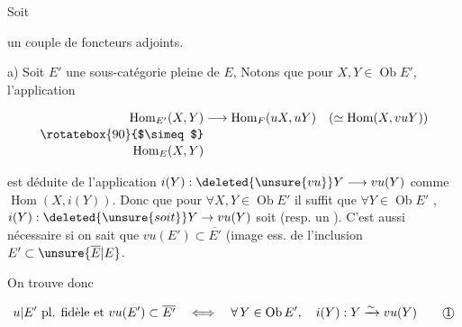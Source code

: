 

Soit


un couple de foncteurs adjoints.

a) Soit $E'$ une sous-catégorie  pleine de $E$,  Notons que pour $X,Y\in\operatorname{Ob}E'$, l'application

\[
\begin{aligned}
\operatorname{Hom}_{E'}(X,Y)&\longrightarrow\operatorname{Hom}_{F}(uX,uY)\quad(\simeq\operatorname{Hom}(X,vuY))\\[-2pt]
\rotatebox{90}{$\simeq$}&\\[-2pt]
\operatorname{Hom}_{E}(X,Y)&
\end{aligned}
\]

est déduite de l'application $i(Y):\deleted{\unsure{vu}}Y\longrightarrow vu(Y)$ comme $\operatorname{Hom}(X,i(Y))$. Donc  que   pour $\forall X,Y\in\operatorname{Ob}E'$  il suffit que $\forall Y\in\operatorname{Ob}E'$ , $i(Y):\deleted{\unsure{soit}}Y\to vu(Y)$ soit  (resp. un \uline{}). C'est aussi nécessaire si on sait que $vu(E')\subset\overline{E'}$ (image ess. de l'inclusion $E'\subset\unsure{\overline E|E}$\unsure{)}.

 On trouve donc

\[
u|E'\ \text{pl. fidèle et }vu(E')\subset\overline{E'}\quad\Longleftrightarrow\quad
\forall\,Y\in\operatorname{Ob}E',\quad i(Y):Y\xrightarrow{\sim}vu(Y)\tag*{\textcircled{1}}\]


